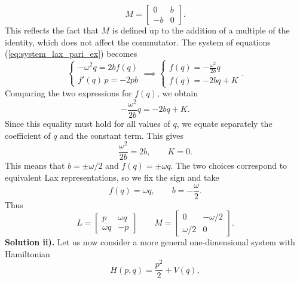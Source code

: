 \begin{equation}
    M = 
    \begin{bmatrix}
        0 & b \\
        -b & 0
    \end{bmatrix}.
\end{equation}
This reflects the fact that $M$ is defined up to the addition of a multiple of the identity, which does not affect the commutator.
The system of equations (\ref{eq:system_lax_pari_ex}) becomes
\begin{equation}
    \begin{cases}
        - \omega^2 q = 2b f(q) \\
        f'(q)\, p = -2pb
    \end{cases}
    \implies
    \begin{cases}
        f(q) = -\frac{\omega^2}{2b} q \\
        f(q) = -2bq + K
    \end{cases}.
\end{equation}
Comparing the two expressions for $f(q)$, we obtain
\begin{equation}
    - \frac{\omega^2}{2b}q = - 2bq + K.
\end{equation}
Since this equality must hold for all values of $q$, we equate separately the coefficient of $q$ and the constant term. This gives
\begin{equation}
    \frac{\omega^2}{2b} = 2b,
    \qquad
    K = 0.
\end{equation}
This means that $b = \pm \omega/2$ and $f(q) = \pm \omega q$. The two choices correspond to equivalent Lax representations, so we fix the sign and take
\begin{equation}
    f(q) = \omega q, \qquad b = - \frac{\omega}{2}.
\end{equation}
Thus
\begin{equation}
    L = 
    \begin{bmatrix}
        p & \omega q \\
        \omega q & -p
    \end{bmatrix}
    \qquad
    M = 
    \begin{bmatrix}
        0 & -\omega / 2 \\
        \omega / 2 & 0
    \end{bmatrix}.
\end{equation}
\textbf{Solution ii).}
Let us now consider a more general one-dimensional system with Hamiltonian
\begin{equation}
    H(p,q) = \frac{p^2}{2} + V(q),
\end{equation}
